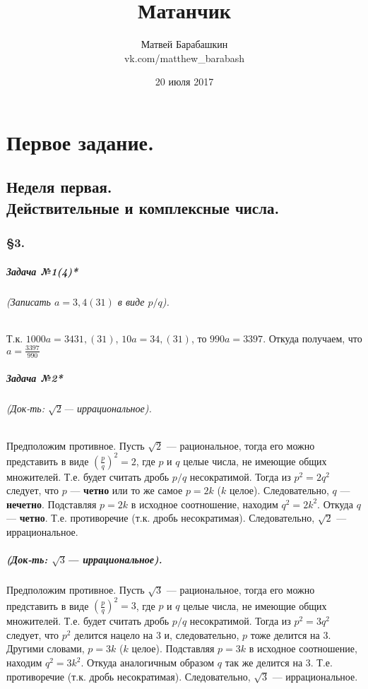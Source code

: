 \documentclass[a4paper,12pt]{report}
\author{Матвей Барабашкин\\vk.com/matthew\_barabash}
\title{Матанчик}
\date{20 июля 2017}
\begin{document}
\maketitle

\chapter{Первое задание.}

\section{Неделя первая.\\ Действительные и комплексные числа.}

\subsection{\S3.\\}

\paragraph{Задача №1(4)*}
\subparagraph{(Записать $ a=3,4(31) $ в виде $ p/q $).}
Т.к. $ 1000a=3431,(31) $, $ 10a=34,(31) $, то 
$ 990a=3397 $. Откуда получаем, что $ a=\frac{3397}{990} $

\paragraph{Задача №2*}\label{sqrt2}
\subparagraph{(Док-ть: $ \sqrt{2} $--- иррациональное).}
Предположим противное.
Пусть $ \sqrt{2} $ --- рациональное, тогда
его можно представить в виде $ (\frac{p}{q})^2=2 $, где
$ p $ и $ q $ целые числа, не имеющие общих множителей.
Т.е. будет считать дробь $ p/q $ несократимой. Тогда
из $ p^2=2q^2 $ следует, что $ p $ --- \textbf{четно} или
то же самое $ p=2k $ ($ k $ целое). Следовательно,
$ q $ --- \textbf{нечетно}. 
Подставляя $ p=2k $ в исходное соотношение, находим
$ q^2=2k^2 $. Откуда $ q $ --- \textbf{четно}. 
Т.е. противоречие (т.к. дробь несократимая). Следовательно,
$ \sqrt{2} $ --- иррациональное.

\paragraph{(Док-ть: $ \sqrt{3} $--- иррациональное).}
Предположим противное.
Пусть $ \sqrt{3} $ --- рациональное, тогда
его можно представить в виде $ (\frac{p}{q})^2=3 $, где
$ p $ и $ q $ целые числа, не имеющие общих множителей.
Т.е. будет считать дробь $ p/q $ несократимой. Тогда
из $ p^2=3q^2 $ следует, что $ p^2 $ делится нацело на 3
и, следовательно, $ p $ тоже делится на 3.
Другими словами, $ p=3k $ ($ k $ целое).
Подставляя $ p=3k $ в исходное соотношение, находим
$ q^2=3k^2 $. Откуда аналогичным образом $ q $ так же делится на 3. 
Т.е. противоречие (т.к. дробь несократимая). Следовательно,
$ \sqrt{3} $ --- иррациональное.
\end{document}
